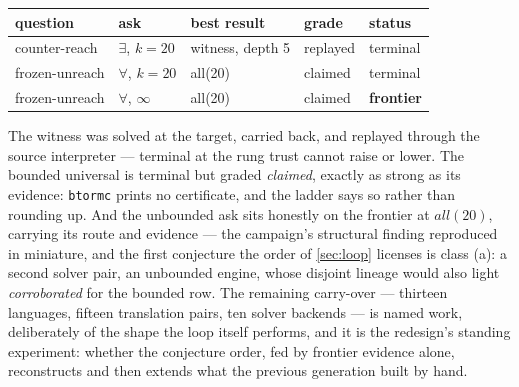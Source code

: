 \begin{center}
\footnotesize
\setlength{\tabcolsep}{4pt}
\begin{tabular}{@{}lllll@{}}
\toprule
question & ask & best result & grade & status \\
\midrule
counter-reach & $\exists$, $k{=}20$ & witness, depth 5 & replayed &
  terminal \\
frozen-unreach & $\forall$, $k{=}20$ & all(20) & claimed &
  terminal \\
frozen-unreach & $\forall$, $\infty$ & all(20) & claimed &
  \textbf{frontier} \\
\bottomrule
\end{tabular}
\end{center}

\noindent
The witness was solved at the target, carried back, and replayed
through the source interpreter --- terminal at the rung trust cannot
raise or lower. The bounded universal is terminal but graded
\emph{claimed}, exactly as strong as its evidence: \texttt{btormc}
prints no certificate, and the ladder says so rather than rounding
up. And the unbounded ask sits honestly on the frontier at
$\textit{all}(20)$, carrying its route and evidence --- the
campaign's structural finding reproduced in miniature, and the first
conjecture the order of \cref{sec:loop} licenses is class (a): a
second solver pair, an unbounded engine, whose disjoint lineage
would also light \emph{corroborated} for the bounded row. The
remaining carry-over --- thirteen languages, fifteen translation
pairs, ten solver backends --- is named work, deliberately of the shape the
loop itself performs, and it is the redesign's standing experiment:
whether the conjecture order, fed by frontier evidence alone,
reconstructs and then extends what the previous generation built by
hand.

